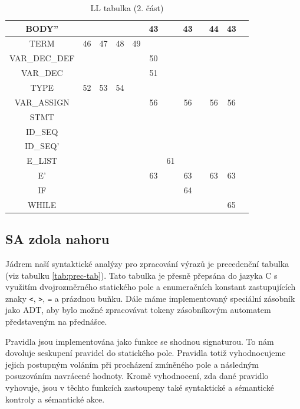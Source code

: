 \documentclass[11pt,a4paper]{article}
\begin{document}
\begin{table}
\begin{tabular}{|c|c|c|c|c|c|l|c|c|c|c|c|}
        BODY'' &  &  &  &  & 43 &  & 43 &  & 44 & 43 &  \\ \hline
        TERM & 46 & 47 & 48 & 49 &  &  &  &  &  &  &  \\ \hline
        VAR\_DEC\_DEF &  &  &  &  & 50 &  &  &  &  &  &  \\ \hline
        VAR\_DEC &  &  &  &  & 51 &  &  &  &  &  &  \\ \hline
        TYPE & 52 & 53 & 54 &  &  &  &  &  &  &  &  \\ \hline
        VAR\_ASSIGN &  &  &  &  & 56 &  & 56 &  & 56 & 56 &  \\ \hline
        STMT &  &  &  &  &  &  &  &  &  &  &  \\ \hline
        ID\_SEQ &  &  &  &  &  &  &  &  &  &  &  \\ \hline
        ID\_SEQ' &  &  &  &  &  &  &  &  &  &  &  \\ \hline
        E\_LIST &  &  &  &  &  & 61 &  &  &  &  &  \\ \hline
        E' &  &  &  &  & 63 &  & 63 &  & 63 & 63 &  \\ \hline
        IF &  &  &  &  &  &  & 64 &  &  &  &  \\ \hline
        WHILE &  &  &  &  &  &  &  &  &  & 65 &  \\ \hline
        \end{tabular}
        \caption{LL tabulka (2. část)}
        \label{tab:ll-tab-2}
        \end{table}
        \newpage
        
        \subsection{SA zdola nahoru}
        Jádrem naší syntaktické analýzy pro zpracování výrazů je precedenční tabulka (viz tabulku \ref{tab:prec-tab}). Tato tabulka je přesně přepsána do jazyka C s využitím dvojrozměrného statického pole a enumeračních konstant zastupujících znaky \texttt{<}, \texttt{>}, \texttt{=} a prázdnou buňku. Dále máme implementovaný speciální zásobník jako ADT, aby bylo možné zpracovávat tokeny zásobníkovým automatem představeným na přednášce.
        
        Pravidla jsou implementována jako funkce se shodnou signaturou. To nám dovoluje seskupení pravidel do statického pole. Pravidla totiž vyhodnocujeme jejich postupným voláním při procházení zmíněného pole a následným posuzováním navrácené hodnoty. Kromě vyhodnocení, zda dané pravidlo vyhovuje, jsou v těchto funkcích zastoupeny také syntaktické a sémantické kontroly a sémantické akce.
        
\end{document}
